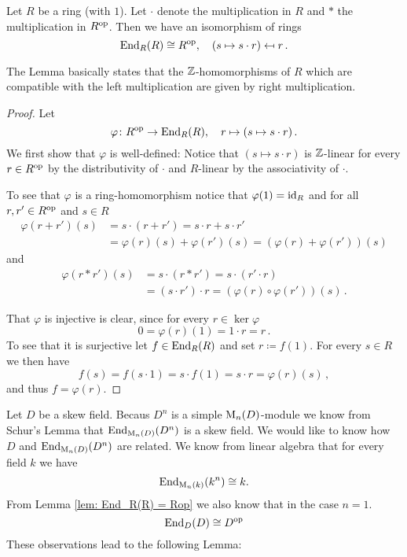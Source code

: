 \begin{lem}\label{lem: End_R(R) = Rop}
  Let $R$ be a ring (with $1$).
  Let $\cdot$ denote the multiplication in $R$ and $*$ the multiplication in $R^{\mathrm{op}}$.
  Then we have an isomorphism of rings
  \[
              \operatorname{End}_R(R)
    \cong     R^{\mathrm{op}},
    \quad     (s \mapsto s \cdot r)
    \mapsfrom r \,.
  \]
\end{lem}


The Lemma basically states that the $\mathbb{Z}$-homomorphisms of $R$ which are compatible with the left multiplication are given by right multiplication.


\begin{proof}
  Let
  \[
            \varphi
    \colon  R^{\mathrm{op}}
    \to     \operatorname{End}_R(R),
    \quad   r
    \mapsto (s \mapsto s \cdot r) \,.
  \]
  We first show that $\varphi$ is well-defined:
  Notice that $(s \mapsto s \cdot r)$ is $\mathbb{Z}$-linear for every $r \in R^{\mathrm{op}}$ by the distributivity of $\cdot$ and $R$-linear by the associativity of $\cdot$.
  
  To see that $\varphi$ is a ring-homomorphism notice that $\varphi(1) = \operatorname{id}_R$ and for all $r, r' \in R^{\mathrm{op}}$ and $s \in R$
  \begin{align*}
        \varphi(r+r')(s)
    &=  s \cdot (r + r')
     =  s \cdot r + s \cdot r' \\
    &=  \varphi(r)(s) + \varphi(r')(s)
     =  (\varphi(r)+\varphi(r'))(s)
  \end{align*}
  and
  \begin{align*}
        \varphi(r * r')(s)
    &=  s \cdot (r * r')
     =  s \cdot (r' \cdot r) \\
    &=  (s \cdot r') \cdot r
     =  \left(\varphi(r) \circ \varphi(r')\right)(s) \,.
  \end{align*}
  
  That $\varphi$ is injective is clear, since for every $r \in \ker \varphi$
  \[
      0
    = \varphi(r)(1)
    = 1 \cdot r
    = r \,.
  \]
  To see that it is surjective let $f \in \operatorname{End}_R(R)$ and set $r \coloneqq f(1)$.
  For every $s \in R$ we then have
  \[
      f(s)
    = f(s \cdot 1)
    = s \cdot f(1)
    = s \cdot r
    = \varphi(r)(s) \,,
  \]
  and thus $f = \varphi(r)$.
\end{proof}


Let $D$ be a skew field.
Becaus $D^n$ is a simple $\operatorname{M}_n(D)$-module we know from Schur’s Lemma that $\operatorname{End}_{\operatorname{M}_n(D)}(D^n)$ is a skew field.
We would like to know how $D$ and $\operatorname{End}_{\operatorname{M}_n(D)}(D^n)$ are related.
We know from linear algebra that for every field $k$ we have
\[
        \operatorname{End}_{\operatorname{M}_n(k)}(k^n)
  \cong k.
\]
From Lemma \ref{lem: End_R(R) = Rop} we also know that in the case $n = 1$. 
\[
  \operatorname{End}_D(D) \cong D^{\mathrm{op}}
\]
These observations lead to the following Lemma:


